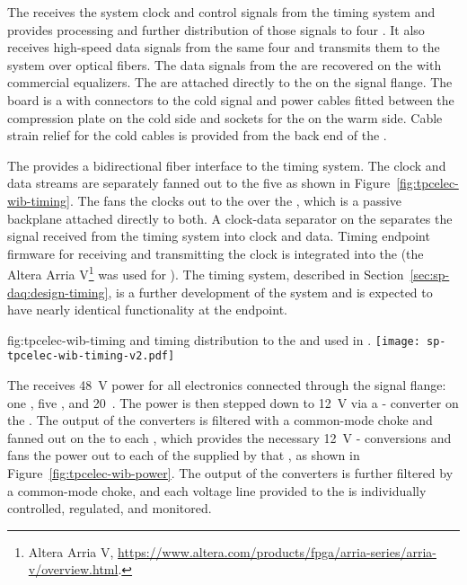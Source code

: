 The  
receives the system clock and control signals from the
timing system and provides processing and further distribution of those signals to four
. 
It also receives high-speed data signals from the same four 
 and transmits them to the  system over optical
fibers. The data signals from the  are recovered on the  with commercial 
equalizers. The  are attached directly to the 
 \fdth on the signal flange. The \fdth board is a  
with connectors to the cold signal and  power cables fitted
between the compression plate on the cold side and sockets for
the  on the warm side. Cable strain relief for the cold cables is 
provided from the back end of the \fdth.

The  provides a bidirectional fiber interface to the
timing system. The clock and data streams are separately fanned out to the 
five  as shown in Figure~\ref{fig:tpcelec-wib-timing}. The 
 fans the clocks out to the  over the , which is a 
passive backplane attached directly to both. A clock-data separator on the 
 separates the signal received from the timing system into clock and data. 
Timing endpoint firmware for receiving and transmitting 
the clock is integrated into the   (the Altera 
Arria V\footnote{Altera Arria\texttrademark{} V, 
\url{https://www.altera.com/products/fpga/arria-series/arria-v/overview.html}.} was used for ). 
The  timing system, described in Section~\ref{sec:sp-daq:design-timing}, 
is a further development of the  system and is expected to have nearly identical 
functionality at the  endpoint.

\begin{dunefigure}
{fig:tpcelec-wib-timing}
{ and timing distribution to the  and  used in .}
\texttt{[image: sp-tpcelec-wib-timing-v2.pdf]}
\end{dunefigure}

The  %
receives \SI{48}{V}  power for all  electronics %
connected through the  signal flange: 
one , five , and \num{20}~. 
The  power is then stepped down to \SI{12}{V} via 
a - converter on the . The output 
of the  converters is filtered with a common-mode choke 
and fanned out on the  to each , which provides the 
necessary \SI{12}{V} - conversions and fans
the  power out to each of the   supplied 
by that , as shown in Figure~\ref{fig:tpcelec-wib-power}. 
The output of the  converters is further filtered by a 
common-mode choke, and each voltage line provided to the 
is individually controlled, regulated, and monitored.


